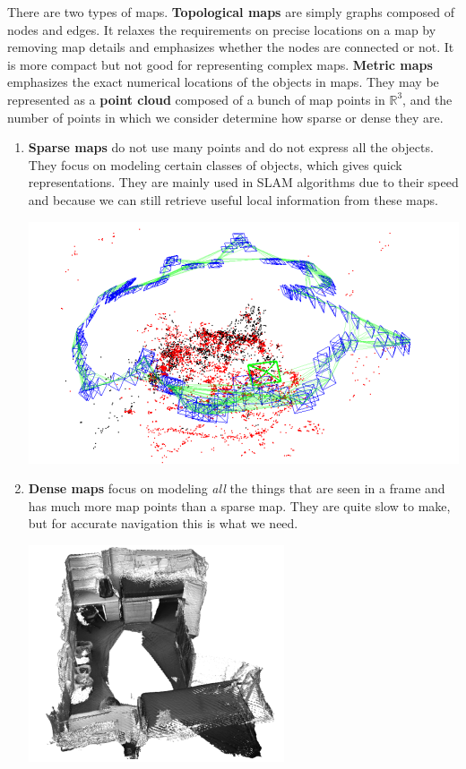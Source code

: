 \documentclass{article}
\theoremstyle{definition}
\theoremstyle{remark}
\theoremstyle{definition}
\begin{document}
There are two types of maps. \textbf{Topological maps} are simply graphs composed of nodes and edges. It relaxes the requirements on precise locations on a map by removing map details and emphasizes whether the nodes are connected or not. It is more compact but not good for representing complex maps. \textbf{Metric maps} emphasizes the exact numerical locations of the objects in maps. They may be represented as a \textbf{point cloud} composed of a bunch of map points in $\mathbb{R}^3$, and the number of points in which we consider determine how sparse or dense they are. 
\begin{enumerate}
    \item \textbf{Sparse maps} do not use many points and do not express all the objects. They focus on modeling certain classes of objects, which gives quick representations. They are mainly used in SLAM algorithms due to their speed and because we can still retrieve useful local information from these maps. 
    \begin{center}
        \includegraphics[scale=0.5]{img/sparse_map.png}
    \end{center}
    
    \item \textbf{Dense maps} focus on modeling \textit{all} the things that are seen in a frame and has much more map points than a sparse map. They are quite slow to make, but for accurate navigation this is what we need. 
    \begin{center}
        \includegraphics[scale=0.5]{img/dense_map.png}
    \end{center}
\end{enumerate}
\end{document}
